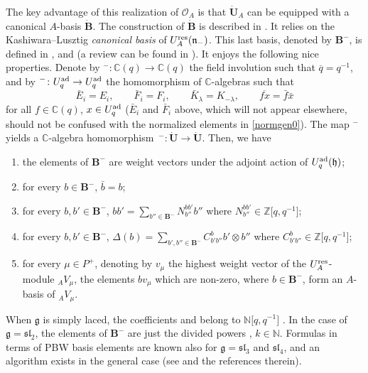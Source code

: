 \documentclass[10pt,a4paper]{amsart}
\numberwithin{equation}{section}
\theoremstyle{definition}
\newcommand{\mc}{\mathbb{C}}
\newcommand{\mz}{\mathbb{Z}}
\newcommand{\mn}{\mathbb{N}}
\newcommand{\Oo}{{\mathcal O}}
\newcommand{\ra}{\rightarrow}
\begin{document}
The key advantage of this realization of $\Oo_A$ is that $\dot{\mathbf{U}}_A$ can be equipped with a canonical $A$-basis $\dot{\mathbf{B}}$. The construction of $\dot{\mathbf{B}}$ is described in \cite[Chapter~25]{Lusztig}. It relies on the Kashiwara--Lusztig {\it canonical basis} of $U_A^{\rm res}(\mathfrak{n}_-)$. This last basis, denoted by $\mathbf{B}^-$, is defined in \cite[Chapter~14]{Lusztig}, and \cite{Kashiwara1} (a review can be found in \cite[Chapter~14]{CP}). It enjoys the following nice properties. Denote by ${}^-\colon \mc(q) \ra \mc(q)$ the field involution such that $\overline{q} = q^{-1}$, and by ${}^-\colon U_q^{\rm ad} \ra U_q^{\rm ad}$ the homomorphism of $\mc$-algebras such that
\[\bar{E}_i = E_i,\qquad \bar{F}_i = F_i,\qquad \bar{K}_\lambda = K_{-\lambda},\qquad \overline{fx} = \bar{f}\bar{x}\]
for all $f\in \mc(q)$, $x\in U_q^{\rm ad}$ ($\bar{E}_i$ and $\bar{F}_i$ above, which will not appear elsewhere, should not be confused with the normalized elements in \eqref{normgen0}). The map ${}^-$ yields a $\mc$-algebra homomorphism~${{}^-\colon \dot{\mathbf{U}} \ra \dot{\mathbf{U}}}$. Then, we have
\begin{enumerate}\itemsep=0pt
\item[(1)] the elements of $\mathbf{B}^-$ are weight vectors under the adjoint action of $U_q^{\rm ad}(\mathfrak{h})$;
\item[(2)] for every $b\in \mathbf{B}^-$, $\bar{b} =b$;
\item[(3)] for every $b,b'\in \mathbf{B}^-$, $bb' = \sum_{b''\in \mathbf{B}^-} N^{bb'}_{b''} b''$ where $N^{bb'}_{b''}\in \mz\big[q,q^{-1}\big]$;
\item[(4)] for every $b,b'\in \mathbf{B}^-$, $\Delta(b) = \sum_{b',b''\in \mathbf{B}^-} C_{b'b''}^b b' \otimes b''$ where $C_{b'b''}^{b}\in \mz\big[q,q^{-1}\big]$;
\item[(5)] for every $\mu\in P^+$, denoting by $v_\mu$ the highest weight vector of the $U_A^{\rm res}$-module ${}_AV_\mu$, the elements $bv_\mu$ which are non-zero, where $b\in \mathbf{B}^-$, form an $A$-basis of ${}_AV_\mu$.
\end{enumerate}
When $\mathfrak{g}$ is simply laced, the coefficients  and  belong to $\mn\big[q,q^{-1}\big]$ \cite[Theorem~14.3.13]{Lusztig}. In the case of $\mathfrak{g}={\mathfrak{sl}_2}$, the elements of $\mathbf{B}^-$ are just the divided powers , $k\in \mn$. Formulas in terms of PBW basis elements are known also for $\mathfrak{g}=\mathfrak{sl}_3$ and $\mathfrak{sl}_4$, and an algorithm exists in the general case (see \cite{deGraaf} and the references therein).
\end{document}
